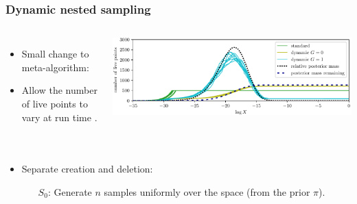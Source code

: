 \documentclass[aspectratio=169]{beamer}
\begin{document}
\begin{frame}
    \frametitle{Dynamic nested sampling}
    \begin{columns}
        \begin{itemize}
            \item Small change to meta-algorithm: 
            \item Allow the number of live points to vary at run time .
        \end{itemize}
        \includegraphics[width=\textwidth]{figures/dynesty}
    \end{columns}
    \begin{columns}
        \begin{itemize}
            \item Separate creation and deletion:
                \begin{itemize}
                    \item[$S_0$:] Generate $n$ samples uniformly over the space (from the prior $\pi$). 


\end{itemize}
\end{itemize}
\end{columns}
\end{frame}
\end{document}
